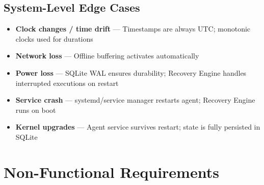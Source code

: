\documentclass[12pt,a4paper]{article}
\begin{document}
\subsection{System-Level Edge Cases}

\begin{itemize}[noitemsep]
    \item \textbf{Clock changes / time drift} — Timestamps are always UTC; monotonic clocks used for durations
    \item \textbf{Network loss} — Offline buffering activates automatically
    \item \textbf{Power loss} — SQLite WAL ensures durability; Recovery Engine handles interrupted executions on restart
    \item \textbf{Service crash} — systemd/service manager restarts agent; Recovery Engine runs on boot
    \item \textbf{Kernel upgrades} — Agent service survives restart; state is fully persisted in SQLite
\end{itemize}

\section{Non-Functional Requirements}
\end{document}
